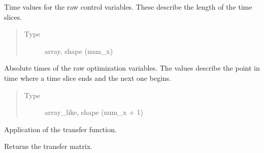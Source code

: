 \documentclass[letterpaper,10pt,english]{sphinxmanual}
\begin{document}
\begin{fulllineitems}
\begin{fulllineitems}
\label{\detokenize{qsim:qsim.transfer_function.TransferFunction._y_times}}
Time values for the raw control variables. These  describe the length
of the time slices.
\begin{quote}\begin{description}
\item[{Type}] \leavevmode
array, shape (num\_x)

\end{description}\end{quote}

\end{fulllineitems}


\begin{fulllineitems}
\label{\detokenize{qsim:qsim.transfer_function.TransferFunction._absolute_y_times}}
Absolute times of the raw optimization variables. The values describe
the point in time where a time slice ends and the next one begins.
\begin{quote}\begin{description}
\item[{Type}] \leavevmode
array\_like, shape (num\_x + 1)

\end{description}\end{quote}

\end{fulllineitems}



\begin{fulllineitems}
Application of the transfer function.

\end{fulllineitems}



\begin{fulllineitems}
Returns the transfer matrix.

\end{fulllineitems}




\end{fulllineitems}
\end{document}
